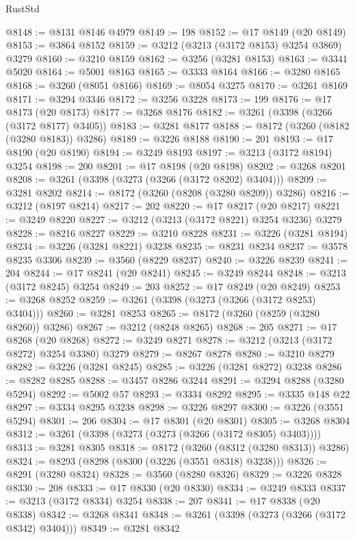 \begin{lexlean}{RustStd}
\begin{coremodule}
{\begin{coremodule}
{{{{{{{{{{{{{{{{{{{{{{{{{{@8148 := @8131 @8146 @4979
@8149 := 198
@8152 := @17 @8149 (@20 @8149)
@8153 := @3864 @8152
@8159 := @3212 (@3213 (@3172 @8153) @3254 @3869) @3279
@8160 := @3210 @8159
@8162 := @3256 (@3281 @8153)
@8163 := @3341 @5020
@8164 := @5001 @8163
@8165 := @3333 @8164
@8166 := @3280 @8165
@8168 := @3260 (@8051 @8166)
@8169 := @8054 @3275
@8170 := @3261 @8169
@8171 := @3294 @3346
@8172 := @3256 @3228
@8173 := 199
@8176 := @17 @8173 (@20 @8173)
@8177 := @3268 @8176
@8182 := @3261 (@3398 (@3266 (@3172 @8177) @3405))
@8183 := @3281 @8177
@8188 := @8172 (@3260 (@8182 (@3280 @8183)) @3286)
@8189 := @3226 @8188
@8190 := 201
@8193 := @17 @8190 (@20 @8190)
@8194 := @3249 @8193
@8197 := @3213 (@3172 @8194) @3254
@8198 := 200
@8201 := @17 @8198 (@20 @8198)
@8202 := @3268 @8201
@8208 := @3261 (@3398 (@3273 (@3266 (@3172 @8202) @3404)))
@8209 := @3281 @8202
@8214 := @8172 (@3260 (@8208 (@3280 @8209)) @3286)
@8216 := @3212 (@8197 @8214)
@8217 := 202
@8220 := @17 @8217 (@20 @8217)
@8221 := @3249 @8220
@8227 := @3212 (@3213 (@3172 @8221) @3254 @3236) @3279
@8228 := @8216 @8227
@8229 := @3210 @8228
@8231 := @3226 (@3281 @8194)
@8234 := @3226 (@3281 @8221) @3238
@8235 := @8231 @8234
@8237 := @3578 @8235 @3306
@8239 := @3560 (@8229 @8237)
@8240 := @3226 @8239
@8241 := 204
@8244 := @17 @8241 (@20 @8241)
@8245 := @3249 @8244
@8248 := @3213 (@3172 @8245) @3254
@8249 := 203
@8252 := @17 @8249 (@20 @8249)
@8253 := @3268 @8252
@8259 := @3261 (@3398 (@3273 (@3266 (@3172 @8253) @3404)))
@8260 := @3281 @8253
@8265 := @8172 (@3260 (@8259 (@3280 @8260)) @3286)
@8267 := @3212 (@8248 @8265)
@8268 := 205
@8271 := @17 @8268 (@20 @8268)
@8272 := @3249 @8271
@8278 := @3212 (@3213 (@3172 @8272) @3254 @3380) @3279
@8279 := @8267 @8278
@8280 := @3210 @8279
@8282 := @3226 (@3281 @8245)
@8285 := @3226 (@3281 @8272) @3238
@8286 := @8282 @8285
@8288 := @3457 @8286 @3244
@8291 := @3294 @8288 (@3280 @5294)
@8292 := @5002 @57
@8293 := @3334 @8292
@8295 := @3335 @148 @22
@8297 := @3334 @8295 @3238
@8298 := @3226 @8297
@8300 := @3226 (@3551 @5294)
@8301 := 206
@8304 := @17 @8301 (@20 @8301)
@8305 := @3268 @8304
@8312 := @3261 (@3398 (@3273 (@3273 (@3266 (@3172 @8305) @3403))))
@8313 := @3281 @8305
@8318 := @8172 (@3260 (@8312 (@3280 @8313)) @3286)
@8324 := @8293 (@8298 (@8300 (@3226 (@3551 @8318) @3238)))
@8326 := @8291 (@3280 @8324)
@8328 := @3560 (@8280 @8326)
@8329 := @3226 @8328
@8330 := 208
@8333 := @17 @8330 (@20 @8330)
@8334 := @3249 @8333
@8337 := @3213 (@3172 @8334) @3254
@8338 := 207
@8341 := @17 @8338 (@20 @8338)
@8342 := @3268 @8341
@8348 := @3261 (@3398 (@3273 (@3266 (@3172 @8342) @3404)))
@8349 := @3281 @8342
}}}}}}}}}}}}}}}}}}}}}}}}}}
\end{coremodule}}
\end{coremodule}
\end{lexlean}
